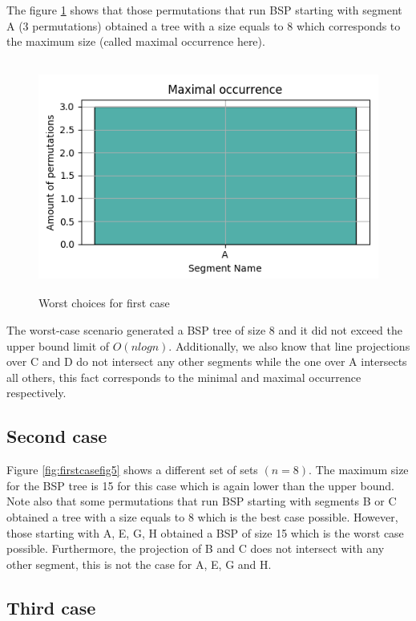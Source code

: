 \documentclass{article}
\begin{document}
The figure \ref{fig:firstcasefig4} shows that those permutations that run BSP starting with segment A (3 permutations) obtained a tree with a size equals to 8 which corresponds to the maximum size (called maximal occurrence here).

\begin{figure}[H]
	\centering
	\includegraphics[height=3in]{Figure4.png}
	\caption {Worst choices for first case}
	\label{fig:firstcasefig4}
\end{figure}

The worst-case scenario generated a BSP tree of size 8 and it did not exceed the upper bound limit of $O(nlogn)$. Additionally, we also know that line projections over C and D do not intersect any other segments while the one over A intersects all others, this fact corresponds to the minimal and maximal occurrence respectively.

\subsection{Second case}

Figure \ref{fig:firstcasefig5} shows a different set of sets $(n=8)$. The maximum size for the BSP tree is 15 for this case which is again lower than the upper bound. Note also that some permutations that run BSP starting with segments B or C obtained a tree with a size equals to 8 which is the best case possible. However, those starting with A, E, G, H obtained a BSP of size 15 which is the worst case possible. Furthermore, the projection of B and C does not intersect with any other segment, this is not the case for A, E, G and H.

\subsection{Third case}
\end{document}
